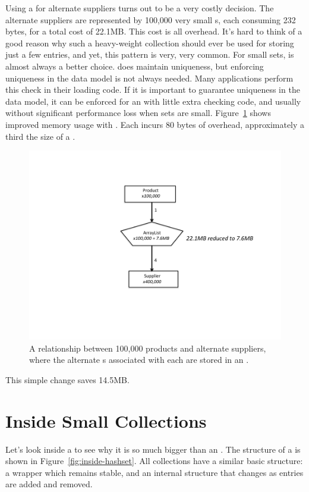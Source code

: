 Using a  for alternate suppliers turns out to be a
very costly decision. The alternate suppliers are represented by 100,000
very small s, each consuming 232 bytes, for a total cost of 22.1MB. 
This cost is all overhead.
It's hard to think of a good reason why such a heavy-weight collection should ever be used
 for storing just a few entries, and yet, this pattern is very, very common. For
 small sets,  is almost always a better choice. 
 does maintain uniqueness, but enforcing uniqueness
in the data model is not always needed. Many applications
 perform this check in their loading code. If it is
important to guarantee uniqueness in the data model, it can be enforced for an
 with  little extra checking code, and usually without significant performance
 loss when sets are small.  Figure~\ref{fig:product-arraylist} shows improved memory usage with
 . Each  incurs 80 bytes of overhead, approximately a third the size of
 a .
 \begin{figure}
  \centering
 \includegraphics[width=.80\textwidth]{part1/Figures/collections/product-arraylist.pdf}
 \caption{A relationship between 100,000 products and alternate suppliers,
 where the alternate s associated with each
  are stored in an .}
  \label{fig:product-arraylist}
\end{figure}
This simple change saves 14.5MB. 


\section{Inside Small Collections}
\label{sec:collectioncost}
Let's look inside a  to see why it is so much bigger than an
.
The structure of a  is shown in
Figure~\ref{fig:inside-hashset}. All
collections have a similar basic structure: a wrapper
which remains stable, and an internal structure that changes as entries are
added and removed.

